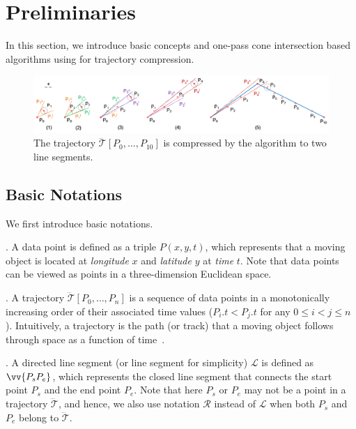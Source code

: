 \section{Preliminaries}
In this section, we introduce basic concepts and one-pass cone intersection based algorithms using \sed for trajectory compression.


\begin{figure}[tb!]
\centering
\includegraphics[scale=0.8]{figures/Fig-sleeve.png}
\vspace{-2.5ex}
\caption{\small The trajectory $\dddot{\mathcal{T}}[P_0, \ldots, P_{10}]$ is compressed by the \conei algorithm to two line segments.}
\vspace{-2ex}
\label{fig:sleeve}
\end{figure}



\subsection{Basic Notations}

We first introduce basic notations.

. A data point is defined as a triple $P(x, y, t)$, which represents that a moving object is located at {\em longitude} $x$ and {\em latitude} $y$ at {\em time} $t$. Note that data points can be viewed as points in a three-dimension Euclidean space.

. A trajectory $\dddot{\mathcal{T}}[P_0, \ldots, P_n]$ is a sequence of data points in a monotonically increasing order of their associated time values (\ie $P_i.t < P_j.t$ for any $0\le i<j\le n$). Intuitively, a trajectory is the path (or track) that a moving object follows through space as a function of time~\cite{physics-trajectory}.


. A directed line segment (or line segment for simplicity) $\mathcal{L}$ is defined as $\vv{P_{s}P_{e}}$, which represents the closed line segment that connects the start point $P_s$ and the end point $P_e$.
Note that here $P_s$ or $P_e$ may not be a point in a trajectory $\dddot{\mathcal{T}}$, and hence, we also use notation $\mathcal{R}$ instead of $\mathcal{L}$ when both $P_s$ and $P_e$ belong to $\dddot{\mathcal{T}}$.

